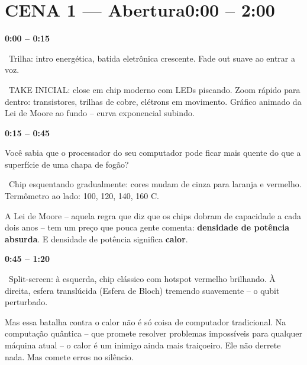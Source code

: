 \documentclass[12pt, a4paper]{article}
\newcommand{\tempo}[1]{%
  \noindent\hfill
  {\small\sffamily\color{corTempo}%
   \faStopwatch\enspace\textbf{#1}}%
  \par\vspace{2pt}%
}
\begin{document}
\tableofcontents
\newpage

\section{CENA 1 --- Abertura\hfill\normalfont\small\color{corTempo}0:00 -- 2:00}

\tempo{0:00 -- 0:15}

\begin{audiocue}
\faMusic\ Trilha: intro energética, batida eletrônica crescente. Fade out suave ao entrar a voz.
\end{audiocue}

\begin{visual}
\faFilm\ TAKE INICIAL: close em chip moderno com LEDs piscando. Zoom rápido para dentro:
transistores, trilhas de cobre, elétrons em movimento. Gráfico animado da Lei de Moore
ao fundo -- curva exponencial subindo.
\end{visual}

\tempo{0:15 -- 0:45}

\begin{fala}
Você sabia que o processador do seu computador pode ficar mais quente do que
a superfície de uma chapa de fogão?
\end{fala}

\begin{visual}
\faFilm\ Chip esquentando gradualmente: cores mudam de cinza para laranja e vermelho.
Termômetro ao lado: 100, 120, 140, 160 {\textdegree}C.
\end{visual}

\begin{fala}
A Lei de Moore -- aquela regra que diz que os chips dobram de capacidade a cada
dois anos -- tem um preço que pouca gente comenta: \textbf{densidade de potência
absurda}. E densidade de potência significa \textbf{calor}.
\end{fala}

\tempo{0:45 -- 1:20}

\begin{visual}
\faFilm\ Split-screen: à esquerda, chip clássico com hotspot vermelho brilhando.
À direita, esfera translúcida (Esfera de Bloch) tremendo suavemente -- o qubit perturbado.
\end{visual}

\begin{fala}
Mas essa batalha contra o calor não é só coisa de computador tradicional.
Na computação quântica -- que promete resolver problemas impossíveis para qualquer
máquina atual -- o calor é um inimigo ainda mais traiçoeiro.
Ele não derrete nada. Mas comete erros no silêncio.
\end{fala}
\end{document}
